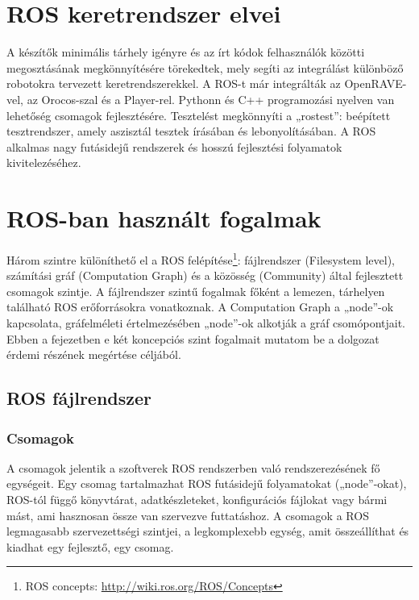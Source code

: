 \section{ROS keretrendszer elvei} %
A készítők minimális tárhely igényre és az írt kódok felhasználók közötti megosztásának megkönnyítésére törekedtek, mely segíti az integrálást különböző robotokra tervezett keretrendszerekkel. A ROS-t már integrálták az OpenRAVE-vel, az Orocos-szal és a Player-rel. Pythonn és C++ programozási nyelven van lehetőség csomagok fejlesztésére. Tesztelést megkönnyíti a „rostest”: beépített tesztrendszer, amely aszisztál tesztek írásában és lebonyolításában. A ROS alkalmas nagy futásidejű rendszerek és hosszú fejlesztési folyamatok kivitelezéséhez.

\section{ROS-ban használt fogalmak}
Három szintre különíthető el a ROS felépítése\footnote{ROS concepts: \url{http://wiki.ros.org/ROS/Concepts}}: fájlrendszer (Filesystem level), számítási gráf (Computation Graph) és a közösség (Community) által fejlesztett csomagok szintje. A fájlrendszer szintű fogalmak főként a lemezen, tárhelyen található ROS erőforrásokra vonatkoznak. A Computation Graph a „node”-ok kapcsolata, gráfelméleti értelmezésében „node”-ok alkotják a gráf csomópontjait. Ebben a fejezetben e két koncepciós szint fogalmait mutatom be a dolgozat érdemi részének megértése céljából.

\subsection{ROS fájlrendszer}
\subsubsection{Csomagok}
A csomagok jelentik a szoftverek ROS rendszerben való rendszerezésének fő egységeit. Egy csomag tartalmazhat ROS futásidejű folyamatokat („node”-okat), ROS-tól függő könyvtárat, adatkészleteket, konfigurációs fájlokat vagy bármi mást, ami hasznosan össze van szervezve futtatáshoz. A csomagok a ROS legmagasabb szervezettségi szintjei, a legkomplexebb egység, amit összeállíthat és kiadhat egy fejlesztő, egy csomag.


